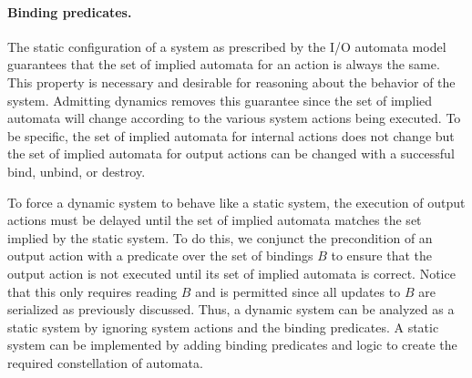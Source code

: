 \paragraph{Binding predicates.}
The static configuration of a system as prescribed by the I/O automata model guarantees that the set of implied automata for an action is always the same.
This property is necessary and desirable for reasoning about the behavior of the system.
Admitting dynamics removes this guarantee since the set of implied automata will change according to the various system actions being executed.
To be specific, the set of implied automata for internal actions does not change but the set of implied automata for output actions can be changed with a successful bind, unbind, or destroy.

To force a dynamic system to behave like a static system, the execution of output actions must be delayed until the set of implied automata matches the set implied by the static system.
To do this, we conjunct the precondition of an output action with a predicate over the set of bindings $B$ to ensure that the output action is not executed until its set of implied automata is correct.
Notice that this only requires reading $B$ and is permitted since all updates to $B$ are serialized as previously discussed.
Thus, a dynamic system can be analyzed as a static system by ignoring system actions and the binding predicates.
A static system can be implemented by adding binding predicates and logic to create the required constellation of automata.
